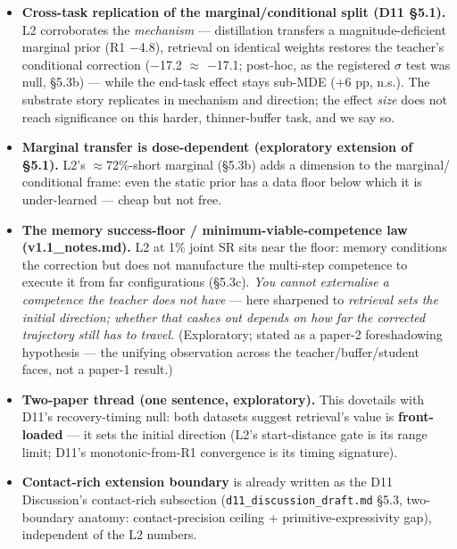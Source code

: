 
\begin{itemize}
\item \textbf{Cross-task replication of the marginal/conditional split (D11 \S5.1).}
  L2 corroborates the \emph{mechanism} --- distillation transfers a
  magnitude-deficient marginal prior (R1 $-$4.8), retrieval on identical
  weights restores the teacher's conditional correction ($-$17.2 $\approx$ $-$17.1;
  post-hoc, as the registered $\sigma$ test was null, \S5.3b) --- while the end-task
  effect stays sub-MDE (+6 pp, n.s.). The substrate story replicates in
  mechanism and direction; the effect \emph{size} does not reach significance
  on this harder, thinner-buffer task, and we say so.
\item \textbf{Marginal transfer is dose-dependent (exploratory extension of \S5.1).}
  L2's $\approx$72\%-short marginal (\S5.3b) adds a dimension to the marginal/
  conditional frame: even the static prior has a data floor below which it
  is under-learned --- cheap but not free.
\item \textbf{The memory success-floor / minimum-viable-competence law
  (v1.1\_notes.md).} L2 at 1\% joint SR sits near the floor: memory
  conditions the correction but does not manufacture the multi-step
  competence to execute it from far configurations (\S5.3c). \emph{You cannot
  externalise a competence the teacher does not have} --- here sharpened to
  \emph{retrieval sets the initial direction; whether that cashes out depends on
  how far the corrected trajectory still has to travel.} (Exploratory;
  stated as a paper-2 foreshadowing hypothesis --- the unifying observation
  across the teacher/buffer/student faces, not a paper-1 result.)
\item \textbf{Two-paper thread (one sentence, exploratory).} This dovetails with
  D11's recovery-timing null: both datasets suggest retrieval's value is
  \textbf{front-loaded} --- it sets the initial direction (L2's start-distance
  gate is its range limit; D11's monotonic-from-R1 convergence is its
  timing signature).
\item \textbf{Contact-rich extension boundary} is already written as the D11
  Discussion's contact-rich subsection (\texttt{d11\_discussion\_draft.md} \S5.3,
  two-boundary anatomy: contact-precision ceiling + primitive-expressivity
  gap), independent of the L2 numbers. 
\end{itemize}

